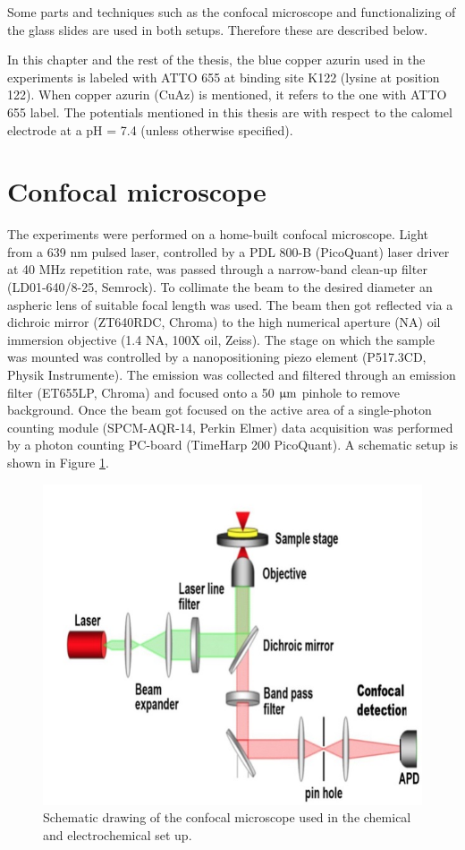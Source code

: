 \documentclass[twoside,single]{lion-msc}
\begin{document}
Some parts and techniques such as the confocal microscope and functionalizing of the glass slides are used in both setups. Therefore these are described below.

In this chapter and the rest of the thesis, the blue copper azurin used in the experiments is  labeled with ATTO 655 at binding site K122 (lysine at position 122). When copper azurin (CuAz) is mentioned, it refers to the one with ATTO 655 label.
The potentials mentioned in this thesis are with respect to the calomel electrode at a pH = 7.4 (unless otherwise specified).


\section*{Confocal microscope}  \label{confo_micro}
The experiments were performed on a home-built confocal microscope. Light from a 639 nm pulsed laser, controlled by a PDL 800-B (PicoQuant) laser driver at 40 MHz repetition rate, was passed through a narrow-band clean-up filter (LD01-640/8-25, Semrock). To collimate the beam to the desired diameter an aspheric lens of suitable focal length was used. The beam then got reflected via a dichroic mirror (ZT640RDC, Chroma) to the high numerical aperture (NA) oil immersion objective (1.4 NA, 100X oil, Zeiss). The stage on which the sample was mounted was controlled by a nanopositioning piezo element (P517.3CD, Physik Instrumente). The emission was collected and filtered through an emission filter (ET655LP, Chroma) and focused onto a 50 $\upmu \textup{m}$ pinhole to remove background. Once the beam got focused on the active area of a single-photon counting module (SPCM-AQR-14, Perkin Elmer) data acquisition was performed by a photon counting PC-board (TimeHarp 200 PicoQuant). A schematic setup is shown in Figure \ref{micros}.

\begin{figure}[ht!]
\centering
\includegraphics[width=.5\textwidth]{schem_micros}
\caption{Schematic drawing of the confocal microscope used in the chemical and electrochemical set up. }
\label{micros}
\end{figure}
\end{document}
